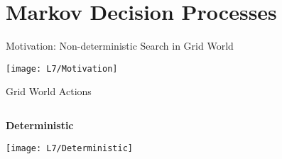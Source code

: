 \documentclass[11pt,aspectratio=169,handout]{beamer}
\subtitle{\vspace{2.1em}Lecture 7: Stochastic Games}
\begin{document}
 \begin{frame}[plain]
  \titlepage
 \end{frame}
 
 
 \section{Markov Decision Processes}
 
  \begin{frame}{Motivation: Non-deterministic Search in Grid World}
   \begin{center}
    \texttt{[image: L7/Motivation]}
   \end{center}
  \end{frame}
  
  
  \begin{frame}{Grid World Actions}
   \begin{columns}
    \begin{column}{0.3\textwidth}
     \begin{center}
      \textbf{Deterministic}
     \end{center}
     \vspace{0.05cm}
     \begin{center}
      \texttt{[image: L7/Deterministic]}
     \end{center}
    \end{column}
    \begin{column}{0.7\textwidth}
    \end{column}
   \end{columns}
  \end{frame}
  
\end{document}
